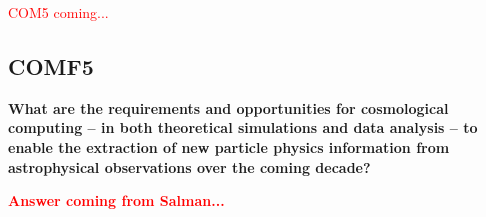\textcolor{red} {COM5 coming...}
\subsection{COMF5}
 
 {\bf
 What are the requirements and opportunities for cosmological computing -- in both
theoretical simulations and data analysis -- to enable the extraction of new particle
physics information from astrophysical observations over the coming decade?}

\textcolor{red}{
{\bf Answer coming from Salman...}}







